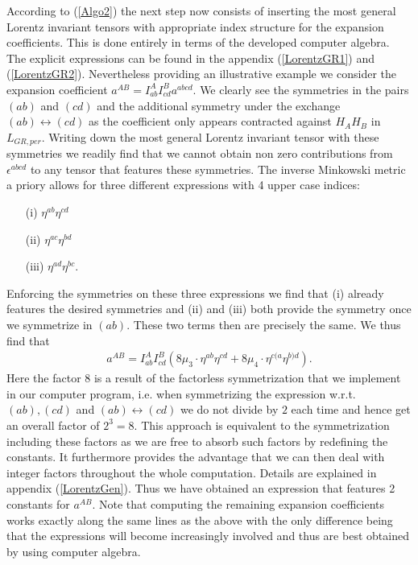 \documentclass[a4paper,12pt, DIV=14, BCOR=5mm, twoside, headsepline]{scrbook}
\begin{document}
According to (\ref{Algo2}) the next step now consists of inserting the most general Lorentz invariant tensors with appropriate index structure for the expansion coefficients. This is done entirely in terms of the developed computer algebra. The explicit expressions can be found in the appendix (\ref{LorentzGR1}) and (\ref{LorentzGR2}).
Nevertheless providing an illustrative example we consider the expansion coefficient $a^{AB} = I^{A}_{ab}I^{B}_{cd}a^{abcd}$. We clearly see the symmetries in the pairs $(ab)$ and $(cd)$ and the additional symmetry under the exchange $(ab) \leftrightarrow (cd)$ as the coefficient only appears contracted against $H_AH_B$ in $L_{GR,per}$. Writing down the most general Lorentz invariant tensor with these symmetries we readily find that we cannot obtain non zero contributions from $\epsilon^{abcd}$ to any tensor that features these symmetries. The inverse Minkowski metric a priory allows for three different expressions with 4 upper case indices:
\begin{itemize}
    \item[(i)] $\eta^{ab} \eta^{cd}$ 
    \item[(ii)] $\eta^{ac} \eta^{bd}$ 
    \item[(iii)] $\eta^{ad} \eta^{bc}$.
\end{itemize}
Enforcing the symmetries on these three expressions we find that (i) already features the desired symmetries and (ii) and (iii) both provide the symmetry once we symmetrize in $(ab)$. These two terms then are precisely the same. We thus find that 
\begin{align}
    a^{AB} = I^{A}_{ab}I^{B}_{cd} \left ( 8\mu_3 \cdot \eta^{ab}\eta^{cd} + 8\mu_4 \cdot \eta^{c(a} \eta^{b)d}   \right ).
\end{align}
Here the factor $8$ is a result of the factorless symmetrization that we implement in our computer program, i.e. when symmetrizing the expression w.r.t. $(ab),(cd)$ and $(ab) \leftrightarrow (cd) $ we do not divide by $2$ each time and hence get an overall factor of $2^3=8$. This approach is equivalent to the symmetrization including these factors as we are free to absorb such factors by redefining the constants. It furthermore provides the advantage that we can then deal with integer factors throughout the whole computation. Details are explained in appendix (\ref{LorentzGen}).
Thus we have obtained an expression that features 2 constants for $a^{AB}$.
Note that computing the remaining expansion coefficients works exactly along the same lines as the above with the only difference being that the expressions will become increasingly involved and thus are best obtained by using computer algebra.
\end{document}
